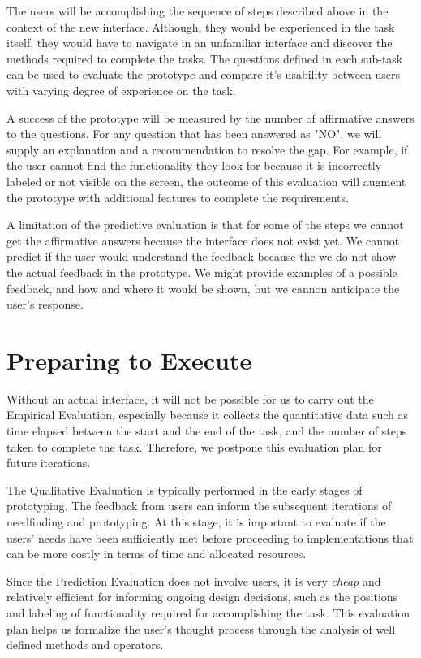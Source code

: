 \documentclass[12pt,letterpaper]{article}
\begin{document}
The users will be accomplishing the sequence of steps described above in the context of the new interface. Although, they would be experienced in the task itself, they would have to navigate in an unfamiliar interface and discover the methods required to complete the tasks. The questions defined in each sub-task can be used to evaluate the prototype and compare it's usability between users with varying degree of experience on the task. 

A success of the prototype will be measured by the number of affirmative answers to the questions. For any question that has been answered as "NO", we will supply an explanation and a recommendation to resolve the gap. For example, if the user cannot find the functionality they look for because it is incorrectly labeled or not visible on the screen, the outcome of this evaluation will augment the prototype with additional features to complete the requirements. 

A limitation of the predictive evaluation is that for some of the steps we cannot get the affirmative answers because the interface does not exist yet. We cannot predict if the user would understand the feedback because the we do not show the actual feedback in the prototype. We might provide examples of a possible feedback, and how and where it would be shown, but we cannon anticipate the user's response. 

\section*{Preparing to Execute}

Without an actual interface, it will not be possible for us to carry out the Empirical Evaluation, especially because it collects the quantitative data such as time elapsed between the start and the end of the task, and the number of steps taken to complete the task. Therefore, we postpone this evaluation plan for future iterations. 

The Qualitative Evaluation is typically performed  in the early stages of prototyping. The feedback from users can inform the subsequent iterations of needfinding and prototyping. At this stage, it is important to evaluate if the users' needs have been sufficiently met before proceeding to implementations that can be more costly in terms of time and allocated resources. 

Since the Prediction Evaluation does not involve users, it is very \textit{cheap} and relatively efficient for informing ongoing design decisions, such as the positions and labeling of functionality required for accomplishing the task. This evaluation plan helps us formalize the user's thought process through the analysis of well defined methods and operators. 
\end{document}

